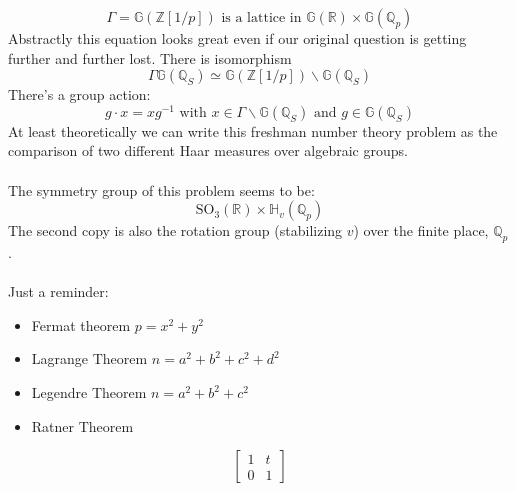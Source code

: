 \documentclass[12pt]{article}
\begin{document}
{$$ \Gamma = \mathbb{G}(\mathbb{Z}[1/p]) \text{ is a lattice in } \mathbb{G}(\mathbb{R}) \times \mathbb{G}(\mathbb{Q}_p) $$
Abstractly this equation looks great even if our original question is getting further and further lost.   There is isomorphism
$$ \Gamma \mathbb{G}(\mathbb{Q}_S) \simeq \mathbb{G}(\mathbb{Z}[1/p]) \backslash \mathbb{G}(\mathbb{Q}_S) $$
There's a group action:
$$ g \cdot x = xg^{-1} \text{ with }x \in \Gamma \backslash \mathbb{G}(\mathbb{Q}_S) \text{ and } g \in \mathbb{G}(\mathbb{Q}_S) $$
At least theoretically we can write this freshman number theory problem as the comparison of two different Haar measures over algebraic groups. \\ \\  
The symmetry group of this problem seems to be: 
$$ \text{SO}_3(\mathbb{R}) \times \mathbb{H}_v(\mathbb{Q}_p) $$
The second copy is also the rotation group (stabilizing $v$) over the finite place, $\mathbb{Q}_p$. \\ \\
Just a reminder: 
\begin{itemize}
\item Fermat theorem $p = x^2 + y^2$
\item Lagrange Theorem $n = a^2 + b^2 + c^2 + d^2$
\item Legendre Theorem $n = a^2 + b^2 + c^2$
\item Ratner Theorem 
\end{itemize}
$$ \left[ \begin{array}{cc} 1 & t \\ 0 & 1 \end{array} \right] $$
}
\end{document}
